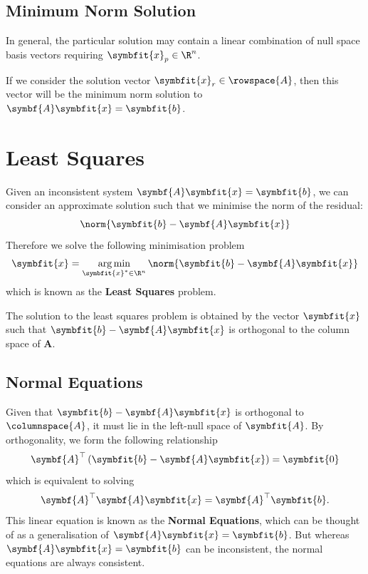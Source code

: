\documentclass{article}
\DeclareMathOperator*{\argmin}{arg\,min}
\begin{document}
\subsection{Minimum Norm Solution}
In general, the particular solution may contain a linear combination of
null space basis vectors requiring \(\symbfit{x}_p \in \R^n\).

If we consider the solution vector \(\symbfit{x}_r \in \rowspace{A}\), then this vector
will be the minimum norm solution to \(\symbf{A}\symbfit{x} = \symbfit{b}\).
\section{Least Squares}
Given an inconsistent system \(\symbf{A}\symbfit{x} = \symbfit{b}\), we can consider an approximate solution such that we
minimise the norm of the residual:
\begin{equation*}
    \norm{\symbfit{b} - \symbf{A}\symbfit{x}}
\end{equation*}
Therefore we solve the following minimisation problem
\begin{equation*}
    \symbfit{x} = \argmin_{\symbfit{x}^\ast \in \R^n} \norm{\symbfit{b} - \symbf{A}\symbfit{x}}
\end{equation*}
which is known as the \textbf{Least Squares} problem.
\begin{theorem}
    The solution to the least squares problem is obtained by the vector \(\symbfit{x}\) such
    that \(\symbfit{b} - \symbf{A}\symbfit{x}\) is orthogonal to the column space of \(\symbf{A}\).
\end{theorem}
\subsection{Normal Equations}
Given that \(\symbfit{b} - \symbf{A}\symbfit{x}\) is orthogonal to \(\columnspace{A}\), it must lie in the
left-null space of \(\symbfit{A}\). By orthogonality, we form the following relationship
\begin{equation*}
    \symbf{A}^\top \left( \symbfit{b} - \symbf{A}\symbfit{x} \right) = \symbfit{0}
\end{equation*}
which is equivalent to solving
\begin{equation*}
    \symbf{A}^\top \symbf{A}\symbfit{x} = \symbf{A}^\top \symbfit{b}.
\end{equation*}
This linear equation is known as the \textbf{Normal Equations}, which can be thought of as
a \linebreak generalisation of \(\symbf{A}\symbfit{x} = \symbfit{b}\). But whereas \(\symbf{A}\symbfit{x} = \symbfit{b}\)
can be inconsistent, the normal equations are always consistent.
\end{document}
